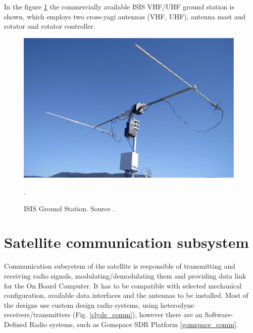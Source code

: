 In the figure \ref{isis_gs} the commercially available ISIS VHF/UHF ground station is shown, which employs two cross-yagi antennas (VHF, UHF), antenna mast and rotator and rotator controller.

\begin{figure}[H]
    \centering
    \includegraphics[width=0.5\paperwidth]{img/2/isis_gs.jpg}
    \caption{ISIS Ground Station. Source \cite{isis_gs}.}.
    \label{isis_gs}
\end{figure}

\section{Satellite communication subsystem}
Communication subsystem of the satellite is responsible of transmitting and receiving radio signals, modulating/demodulating them and providing data link for the On Board Computer. It has to be compatible with selected mechanical configuration, available data interfaces and the antennas to be installed. Most of the designs use custom design radio systems, using heterodyne receivers/transmitters (Fig. \ref{clyde_comm}), however there are an Software-Defined Radio systems, such as Gomspace SDR Platform \ref{gomspace_comm}.

